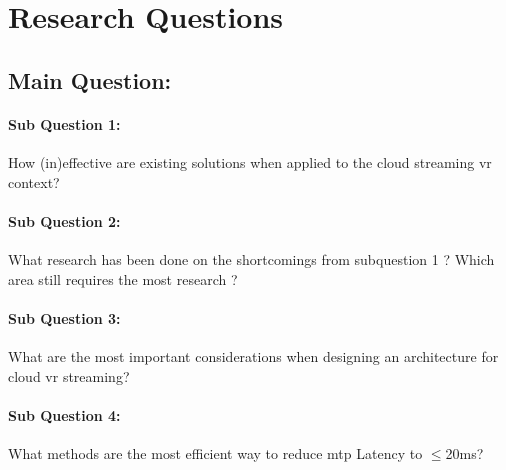 \section{Research Questions}

\subsection*{Main Question:} 
\paragraph{Sub Question 1:} How (in)effective are existing solutions when applied to the cloud streaming \acrshort{vr} context?
\paragraph{Sub Question 2:} What research has been done on the shortcomings from subquestion 1 ? Which area still requires the most research ?
\paragraph{Sub Question 3:} What are the most important considerations when designing an architecture for cloud \acrshort{vr} streaming?
\paragraph{Sub Question 4:} What methods are the most efficient way to reduce \acrfull{mtp} Latency to $\leq$20\acrshort{ms}?
